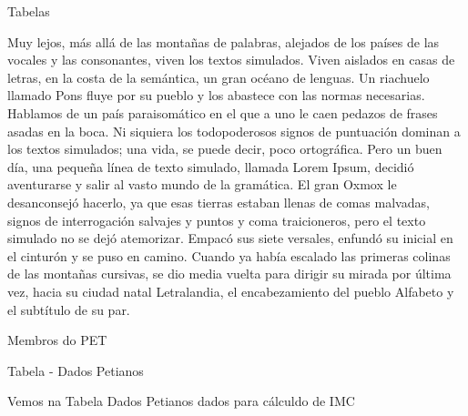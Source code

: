 Tabelas

Muy lejos, más allá de las montañas de palabras, alejados de los países de las vocales y las consonantes, viven los textos simulados. Viven aislados en casas de letras, en la costa de la semántica, un gran océano de lenguas. Un riachuelo llamado Pons fluye por su pueblo y los abastece con las normas necesarias. Hablamos de un país paraisomático en el que a uno le caen pedazos de frases asadas en la boca. Ni siquiera los todopoderosos signos de puntuación dominan a los textos simulados; una vida, se puede decir, poco ortográfica. Pero un buen día, una pequeña línea de texto simulado, llamada Lorem Ipsum, decidió aventurarse y salir al vasto mundo de la gramática. El gran Oxmox le desanconsejó hacerlo, ya que esas tierras estaban llenas de comas malvadas, signos de interrogación salvajes y puntos y coma traicioneros, pero el texto simulado no se dejó atemorizar. Empacó sus siete versales, enfundó su inicial en el cinturón y se puso en camino. Cuando ya había escalado las primeras colinas de las montañas cursivas, se dio media vuelta para dirigir su mirada por última vez, hacia su ciudad natal Letralandia, el encabezamiento del pueblo Alfabeto y el subtítulo de su par.

Membros do PET


Tabela - Dados Petianos

Vemos na Tabela Dados Petianos dados para cálculdo de IMC












